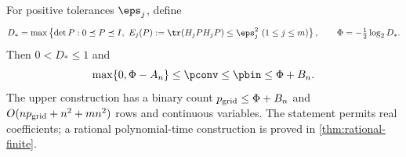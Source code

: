 \begin{theorem}\label{thm:finite-covariance}
For positive tolerances $\eps_j$, define
\begin{equation}\label{eq:finite-determinant}
 D_* =\max\left\{\det P:0\preceq P\preceq I,
   \ E_j(P):=\tr(H_jPH_jP)\le\eps_j^2\ (1\le j\le m)\right\},
 \qquad \Phi=-\tfrac12\log_2D_*.
\end{equation}
Then $0<D_*\le1$ and
\begin{equation}\label{eq:finite-law}
 \max\{0,\Phi-A_n\}\le\pconv\le\pbin\le\Phi+B_n.
\end{equation}
The upper construction has a binary count $p_{\rm grid}\le\Phi+B_n$
and $O(np_{\rm grid}+n^2+mn^2)$ rows and continuous variables.
The statement permits real coefficients; a rational polynomial-time
construction is proved in \cref{thm:rational-finite}.
\end{theorem}

